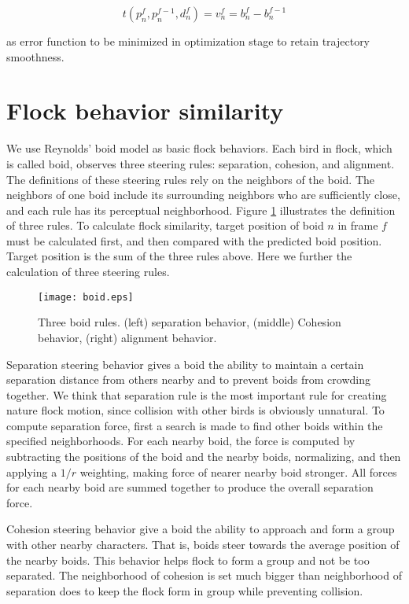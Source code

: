 \begin{equation}\label{eq:4}
 t(p_n^f, p_n^{f-1},d_n^f) = v_n^f = b_n^f-b_n^{f-1}
\end{equation}

as error function to be minimized in optimization stage to retain trajectory smoothness.


\section{Flock behavior similarity}


We use Reynolds' boid model as basic flock behaviors. Each bird in flock, which is called boid, observes three steering rules: separation, cohesion, and alignment. The definitions of these steering rules rely on the neighbors of the boid. The neighbors of one boid include its surrounding neighbors who are sufficiently close, and each rule has its perceptual neighborhood. Figure \ref{figure:boid} illustrates the definition of three rules. To calculate flock similarity, target position of boid $n$ in frame $f$ must be calculated first, and then compared with the predicted boid position. Target position is the sum of the three rules above. Here we further the calculation of three steering rules.


\begin{figure}[h]
 \begin{center}
  \texttt{[image: boid.eps]}
 \end{center}
 \caption{Three boid rules. (left) separation behavior, (middle) Cohesion behavior, (right) alignment behavior.}
 \label{figure:boid}
\end{figure}


Separation steering behavior gives a boid the ability to maintain a certain separation distance from others nearby and to prevent boids from crowding together. We think that separation rule is the most important rule for creating nature flock motion, since collision with other birds is obviously unnatural. To compute separation force, first a search is made to find other boids within the specified neighborhoods. For each nearby boid, the force is computed by subtracting the positions of the boid and the nearby boids, normalizing, and then applying a $1/r$ weighting, making force of nearer nearby boid stronger. All forces for each nearby boid are summed together to produce the overall separation force.


Cohesion steering behavior give a boid the ability to approach and form a group with other nearby characters. That is, boids steer towards the average position of the nearby boids. This behavior helps flock to form a group and not be too separated. The neighborhood of cohesion is set much bigger than neighborhood of separation does to keep the flock form in group while preventing collision.


